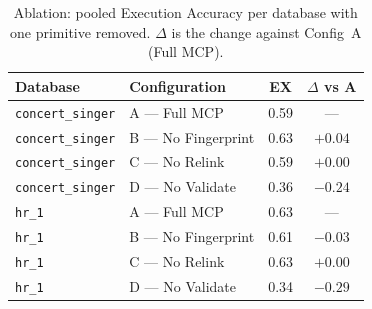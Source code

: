 \documentclass[conference,10pt,a4paper]{IEEEtran}
\begin{document}
\begin{table}[t]
\centering
\caption{Ablation: pooled Execution Accuracy per database with one primitive
removed. $\Delta$ is the change against Config~A (Full MCP).}
\label{tab:ablation}
\begin{tabular}{llcc}
\toprule
\textbf{Database} & \textbf{Configuration} & \textbf{EX} & $\Delta$ \textbf{vs A} \\
\midrule
\texttt{concert\_singer} & A --- Full MCP       & 0.59 & ---     \\
\texttt{concert\_singer} & B --- No Fingerprint & 0.63 & $+0.04$ \\
\texttt{concert\_singer} & C --- No Relink      & 0.59 & $+0.00$ \\
\texttt{concert\_singer} & D --- No Validate    & 0.36 & $-0.24$ \\
\midrule
\texttt{hr\_1}           & A --- Full MCP       & 0.63 & ---     \\
\texttt{hr\_1}           & B --- No Fingerprint & 0.61 & $-0.03$ \\
\texttt{hr\_1}           & C --- No Relink      & 0.63 & $+0.00$ \\
\texttt{hr\_1}           & D --- No Validate    & 0.34 & $-0.29$ \\
\bottomrule
\end{tabular}
\end{table}
\end{document}
